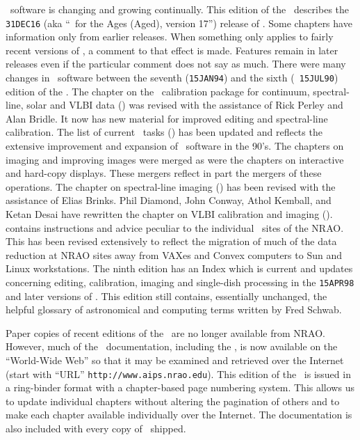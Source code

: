      \AIPS\ software is changing and growing continually.  This
edition of the \COOKBOOK\ describes the {\tt 31DEC16} (aka ``\AIPS\
for the Ages (Aged), version 17'') release of \AIPS.  Some chapters
have information only from earlier releases.  When something only
applies to fairly recent versions of \AIPS, a comment to that effect
is made.  Features remain in later releases even if the particular
comment does not say as much.  There were many changes in \AIPS\
software between the seventh ({\tt 15JAN94}) and the sixth ({\tt
15JUL90}) edition of the \COOKBOOK\@.  The chapter on the \AIPS\
calibration package for continuum, spectral-line, solar and VLBI data
(\Rchap{cal}) was revised with the assistance of Rick Perley and Alan
Bridle.  It now has new material for improved editing and
spectral-line calibration.  The list of current \AIPS\ tasks
(\Rchap{list}) has been updated and reflects the extensive improvement
and expansion of \AIPS\ software in the 90's.  The chapters on imaging
and improving images were merged as were the chapters on interactive
and hard-copy displays. These mergers reflect in part the mergers of
these operations.  The chapter on spectral-line imaging (\Rchap{line})
has been revised with the assistance of Elias Brinks.  Phil Diamond,
John Conway, Athol Kemball, and Ketan Desai have rewritten the chapter
on VLBI calibration and imaging (\Rchap{vlbi}).  \Rappen{sys} contains
instructions and advice peculiar to the individual \AIPS\ sites of the
NRAO\@.  This has been revised extensively to reflect the migration of
much of the data reduction at NRAO sites away from VAXes and Convex
computers to Sun and Linux workstations.  The ninth edition has an
Index which is current and updates concerning editing, calibration,
imaging and single-dish processing in the {\tt 15APR98} and later
versions of \AIPS\@.  This edition still contains, essentially
unchanged, the helpful glossary of astronomical and computing terms
written by Fred Schwab.

Paper copies of recent editions of the \COOKBOOK\ are no longer
available from NRAO\@.  However, much of the \AIPS\ documentation,
including the  \COOKBOOK, is now available on the ``World-Wide Web''
so that it may be examined and retrieved over the Internet (start with
``URL'' {\tt http://www.aips.nrao.edu}).  This edition of the
\Iodx{COOKBOOK}\COOKBOOK\ is issued in a ring-binder format with a
chapter-based page numbering system.  This allows us to update
individual chapters without altering the pagination of others and to
make each chapter available individually over the Internet.  The
documentation is also included with every copy of \AIPS\ shipped.

